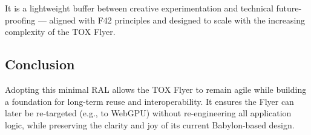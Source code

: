 \documentclass{article}
\begin{document}
It is a lightweight buffer between creative experimentation and technical future-proofing — aligned with F42 principles and designed to scale with the increasing complexity of the TOX Flyer.

\subsection{Conclusion}

Adopting this minimal RAL allows the TOX Flyer to remain agile while building a foundation for long-term reuse and interoperability. It ensures the Flyer can later be re-targeted (e.g., to WebGPU) without re-engineering all application logic, while preserving the clarity and joy of its current Babylon-based design.
\end{document}
